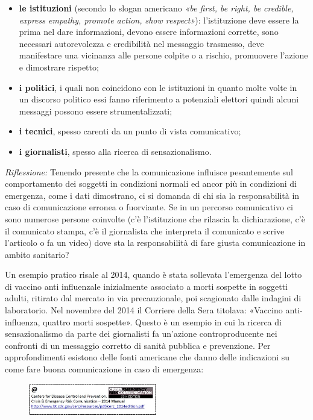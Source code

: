 \begin{itemize}
\item
  \textbf{le istituzioni} (secondo lo slogan americano \emph{«be first,
  be right, be credible, express empathy, promote action, show
  respect»}): l'istituzione deve essere la prima nel dare informazioni,
  devono essere informazioni corrette, sono necessari autorevolezza e
  credibilità nel messaggio trasmesso, deve manifestare una vicinanza
  alle persone colpite o a rischio, promuovere l'azione e dimostrare
  rispetto;
\item
  \textbf{i politici}, i quali non coincidono con le istituzioni in
  quanto molte volte in un discorso politico essi fanno riferimento a
  potenziali elettori quindi alcuni messaggi possono essere
  strumentalizzati;
\item
  \textbf{i tecnici}, spesso carenti da un punto di vista comunicativo;
\item
  \textbf{i giornalisti}, spesso alla ricerca di sensazionalismo.
\end{itemize}

\emph{Riflessione:} Tenendo presente che la comunicazione influisce
pesantemente sul comportamento dei soggetti in condizioni normali ed
ancor più in condizioni di emergenza, come i dati dimostrano, ci si
domanda di chi sia la responsabilità in caso di comunicazione erronea o
fuorviante. Se in un percorso comunicativo ci sono numerose persone
coinvolte (c'è l'istituzione che rilascia la dichiarazione, c'è il
comunicato stampa, c'è il giornalista che interpreta il comunicato e
scrive l'articolo o fa un video) dove sta la responsabilità di fare
giusta comunicazione in ambito sanitario?

Un esempio pratico risale al 2014, quando è stata sollevata l'emergenza
del lotto di vaccino anti influenzale inizialmente associato a morti
sospette in soggetti adulti, ritirato dal mercato in via precauzionale,
poi scagionato dalle indagini di laboratorio. Nel novembre del 2014 il
Corriere della Sera titolava: «Vaccino anti-influenza, quattro morti
sospette». Questo è un esempio in cui la ricerca di sensazionalismo da
parte dei giornalisti fa un'azione controproducente nei confronti di un
messaggio corretto di sanità pubblica e prevenzione. Per approfondimenti
esistono delle fonti americane che danno delle indicazioni su come fare
buona comunicazione in caso di emergenza:

\begin{figure}[!ht]
\centering
	\includegraphics[width=0.5\textwidth]{26/image4.jpeg}
	\end{figure}

